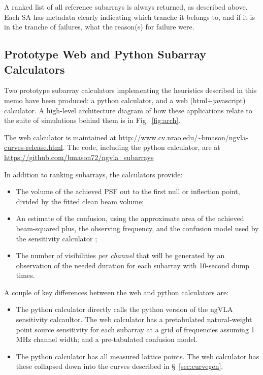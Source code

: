 \documentclass[11pt]{article}
\begin{document}
A ranked list of all reference subarrays is always returned, as
described above.  Each SA has metadata clearly indicating which
tranche it belongs to, and if it is in the tranche of failures, what
the reason(s) for failure were.

\subsection{Prototype Web and Python Subarray Calculators}
\label{sec:code}

Two prototype subarray calculators implementing the heuristics
described in this memo have been produced: a python calculator, and a
web (html+javascript) calculator.  A high-level architecture diagram of how these
applications relate to the suite of simulations behind them is in
Fig.~\ref{fig:arch}.

The web calculator is maintained at
\url{http://www.cv.nrao.edu/~bmason/ngvla-curves-release.html}.
The code, including the python calculator, are at
\url{https://github.com/bmason72/ngvla_subarrays}

In addition to ranking subarrays, the calculators provide:
\begin{itemize}
\item The volume of the achieved PSF out to the first null or inflection point,
  divided by the fitted clean beam volume;
\item An estimate of the confusion, using the approximate area of the achieved
  beam-squared plus, the observing frequency, and the confusion model used by
  the sensitivity calculator \citep{condon2012,matthews2021};
\item  The number of visibilities {\it per channel} that will be generated
  by an observation of the needed duration for each subarray with 10-second dump times.
\end{itemize}

A couple of key differences between the web and python calculators are:
\begin{itemize}
\item The python calculator directly calls the python version of the
  ngVLA sensitivity calcaultor. The web calculator has a pretabulated
  natural-weight point source sensitivity for each subarray at a grid
  of frequencies assuming 1 MHz channel width; and a pre-tabulated
  confusion model.
\item The python calculator has all measured lattice points. The web
  calculator has these collapsed down into the curves described
  in \S~\ref{sec:curvegen}.
\end{itemize}
\end{document}

